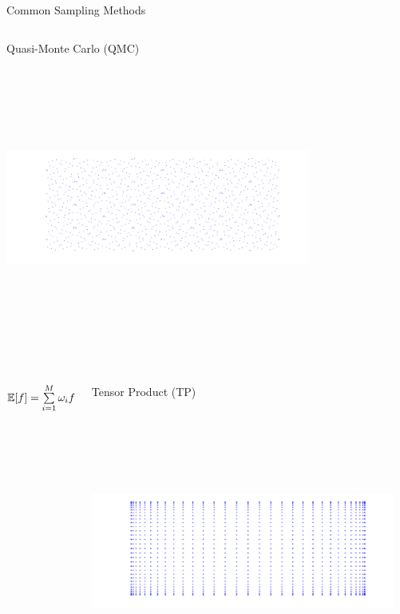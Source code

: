 \documentclass[final]{beamer}
\newcommand{\E}{\ensuremath{\mathbb{E}} } %
\newcommand {\bxi} {\mbox{\boldmath $\xi$}}%
\begin{document}
\begin{frame}{}
{\begin{columns}[t]
\begin{column}{.30\linewidth}
\begin{block}{\centering Common Sampling Methods}
\begin{columns}[T]
\begin{column}{12cm}{\centering \scriptsize{Quasi-Monte Carlo (QMC)}}
\centering\includegraphics[height=10cm, width = 10cm]{figures/Sobolpoints}
\end{column}
\end{columns}

\vspace{0.5em}

\begin{columns}[T]

\begin{column}{10cm}{}
\centering
\vspace{3em}
$\E[f] = \sum\limits_{i=1}^M \omega_i f(\bxi_i)$
\end{column}

\begin{column}{12cm}{\centering \scriptsize{Tensor Product (TP)}}
\centering\includegraphics[height=10cm, width = 10cm]{figures/tensorproductpoints}
\end{column}


\end{columns}
\end{block}
\end{column}
\end{columns}}
\end{frame}
\end{document}
